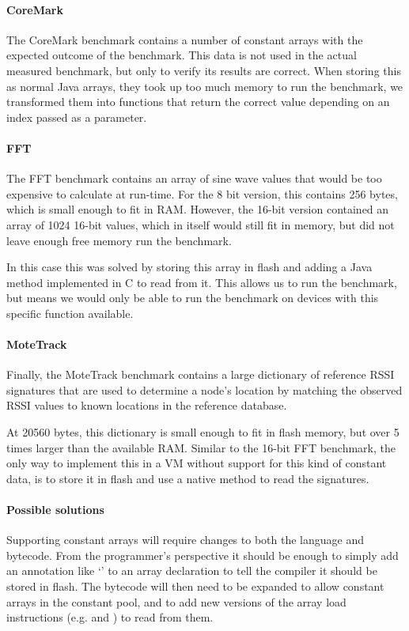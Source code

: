 \paragraph{CoreMark}
The CoreMark benchmark contains a number of constant arrays with the expected outcome of the benchmark. This data is not used in the actual measured benchmark, but only to verify its results are correct. When storing this as normal Java arrays, they took up too much memory to run the benchmark, we transformed them into functions that return the correct value depending on an index passed as a parameter.

\paragraph{FFT}
The FFT benchmark contains an array of sine wave values that would be too expensive to calculate at run-time. For the 8 bit version, this contains 256 bytes, which is small enough to fit in RAM. However, the 16-bit version contained an array of 1024 16-bit values, which in itself would still fit in memory, but did not leave enough free memory run the benchmark.

In this case this was solved by storing this array in flash and adding a Java method implemented in C to read from it. This allows us to run the benchmark, but means we would only be able to run the benchmark on devices with this specific function available.

\paragraph{MoteTrack}
Finally, the MoteTrack benchmark contains a large dictionary of reference RSSI signatures that are used to determine a node's location by matching the observed RSSI values to known locations in the reference database.

At 20560 bytes, this dictionary is small enough to fit in flash memory, but over 5 times larger than the available RAM. Similar to the 16-bit FFT benchmark, the only way to implement this in a VM without support for this kind of constant data, is to store it in flash and use a native method to read the signatures.

\paragraph{Possible solutions}
Supporting constant arrays will require changes to both the language and bytecode. From the programmer's perspective it should be enough to simply add an annotation like `' to an array declaration to tell the compiler it should be stored in flash. The bytecode will then need to be expanded to allow constant arrays in the constant pool, and to add new versions of the array load instructions (e.g.  and ) to read from them.





